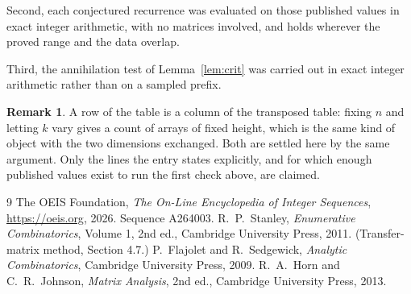 \documentclass[11pt,a4paper]{article}
\theoremstyle{plain}
\theoremstyle{definition}
\newtheorem{remark}[theorem]{Remark}
\begin{document}
Second, each conjectured recurrence was evaluated on those published values in exact
integer arithmetic, with no matrices involved, and holds wherever the proved range and the
data overlap.

Third, the annihilation test of Lemma~\ref{lem:crit} was carried out in exact integer
arithmetic rather than on a sampled prefix.

\begin{remark}
A row of the table is a column of the transposed table: fixing $n$ and letting $k$ vary gives a
count of arrays of fixed height, which is the same kind of object with the two dimensions
exchanged. Both are settled here by the same argument. Only the lines the entry states
explicitly, and for which enough published values exist to run the first check above, are
claimed.
\end{remark}

\begin{thebibliography}{9}
 The OEIS Foundation, \emph{The On-Line Encyclopedia of Integer
Sequences}, \url{https://oeis.org}, 2026. Sequence A264003.
 R.~P.~Stanley, \emph{Enumerative Combinatorics}, Volume 1, 2nd ed.,
Cambridge University Press, 2011. (Transfer-matrix method, Section 4.7.)
 P.~Flajolet and R.~Sedgewick, \emph{Analytic Combinatorics}, Cambridge
University Press, 2009.
 R.~A.~Horn and C.~R.~Johnson, \emph{Matrix Analysis}, 2nd ed., Cambridge
University Press, 2013.
\end{thebibliography}
\end{document}
